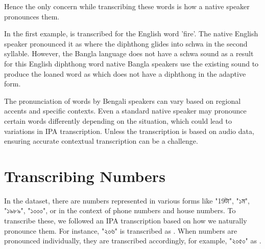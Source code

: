 \vspace{5mm}

Hence the only concern while transcribing these words is how a native speaker pronounces them. 

\begin{table}[!ht]
    \centering
    \caption{Phonetic Transcription of adaptive English words}
\end{table}

In the first example,  is transcribed for the English word 'fire'. The native English speaker pronounced it as  where the diphthong  glides into schwa  in the second syllable. However, the Bangla language does not have a schwa  sound as a result for this English diphthong word native Bangla speakers use the existing sound to produce the loaned word as  which does not have a diphthong in the adaptive form. 

The pronunciation of words by Bengali speakers can vary based on regional accents and specific contexts. Even a standard native speaker may pronounce certain words differently depending on the situation, which could lead to variations in IPA transcription. Unless the transcription is based on audio data, ensuring accurate contextual transcription can be a challenge.

\section{Transcribing Numbers}
In the dataset, there are numbers represented in various forms like \textbengali{"19টা", "১ম", "১৯৮৯", "১০০০"}, or in the context of phone numbers and house numbers. To transcribe these, we followed an IPA transcription based on how we naturally pronounce them. For instance, \textbengali{"২০৬"} is transcribed as . When numbers are pronounced individually, they are transcribed accordingly, for example, \textbengali{"২০৫০"} as .

